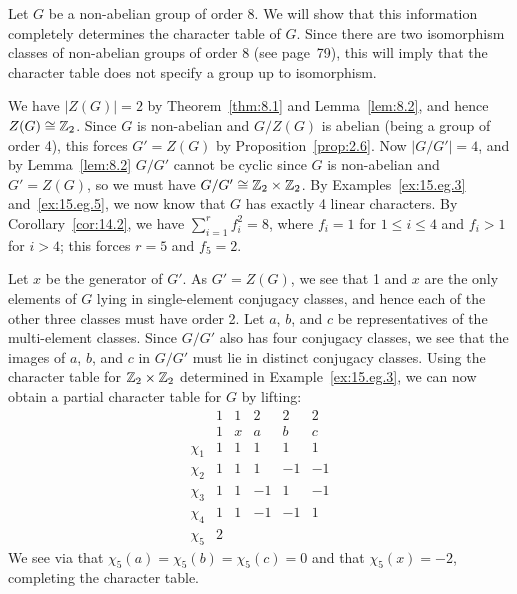 \documentclass[../Odyssey_Project.tex]{subfiles}
\begin{document}
\begin{example}
\label{ex:15.eg.8}
Let $G$ be a non-abelian group of order 8. We will show that this information completely determines the character table of $G$. Since there are two isomorphism classes of non-abelian groups of order 8 (see page~79), this will imply that the character table does not specify a group up to isomorphism.

We have $|Z(G)| = 2$ by Theorem~\ref{thm:8.1} and Lemma~\ref{lem:8.2}, and hence $Z(G) \cong \mathbb{Z}_2$. Since $G$ is non-abelian and $G/Z(G)$ is abelian (being a group of order 4), this forces $G' = Z(G)$ by Proposition~\ref{prop:2.6}. Now $|G/G'| = 4$, and by Lemma~\ref{lem:8.2} $G/G'$ cannot be cyclic since $G$ is non-abelian and $G' = Z(G)$, so we must have $G/G' \cong \mathbb{Z}_2 \times \mathbb{Z}_2$. By Examples~\ref{ex:15.eg.3} and~\ref{ex:15.eg.5}, we now know that $G$ has exactly 4 linear characters. By Corollary~\ref{cor:14.2}, we have $\sum_{i=1}^{r} f_i^2 = 8$, where $f_i = 1$ for $1 \leq i \leq 4$ and $f_i > 1$ for $i > 4$; this forces $r = 5$ and $f_5 = 2$.

Let $x$ be the generator of $G'$. As $G' = Z(G)$, we see that 1 and $x$ are the only elements of $G$ lying in single-element conjugacy classes, and hence each of the other three classes must have order 2. Let $a$, $b$, and $c$ be representatives of the multi-element classes. Since $G/G'$ also has four conjugacy classes, we see that the images of $a$, $b$, and $c$ in $G/G'$ must lie in distinct conjugacy classes. Using the character table for $\mathbb{Z}_2 \times \mathbb{Z}_2$ determined in Example~\ref{ex:15.eg.3}, we can now obtain a partial character table for $G$ by lifting:
\[
    \begin{array}{c|ccccc}
        & 1 & 1 & 2 & 2 & 2 \\
        & 1 & x & a & b & c \\
        \hline
        \chi_1 & 1 & 1 & 1 & 1 & 1 \\
        \chi_2 & 1 & 1 & 1 & -1 & -1 \\
        \chi_3 & 1 & 1 & -1 & 1 & -1 \\
        \chi_4 & 1 & 1 & -1 & -1 & 1 \\
        \chi_5 & 2 & & & &
    \end{array}
\]
We see via  that $\chi_5(a) = \chi_5(b) = \chi_5(c) = 0$ and that $\chi_5(x) = -2$, completing the character table.
\end{example}
\end{document}
